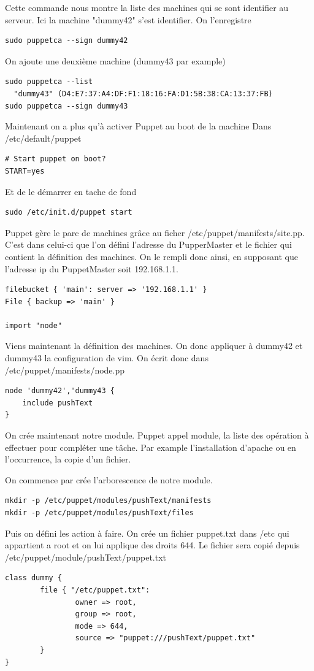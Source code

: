 \documentclass[a4paper,oneside]{report}
\begin{document}
Cette commande nous montre la liste des machines qui se sont identifier au serveur.
Ici la machine "dummy42" s'est identifier.
On l'enregistre
\begin{verbatim}
sudo puppetca --sign dummy42
\end{verbatim}

On ajoute une deuxième machine (dummy43 par example)
\begin{verbatim}
sudo puppetca --list
  "dummy43" (D4:E7:37:A4:DF:F1:18:16:FA:D1:5B:38:CA:13:37:FB)
sudo puppetca --sign dummy43
\end{verbatim}

Maintenant on a plus qu'à activer Puppet au boot de la machine
Dans /etc/default/puppet
\begin{verbatim}
# Start puppet on boot?
START=yes
\end{verbatim}
Et de le démarrer en tache de fond
\begin{verbatim}
sudo /etc/init.d/puppet start
\end{verbatim}

Puppet gère le parc de machines grâce au ficher /etc/puppet/manifests/site.pp. C'est dans celui-ci que l'on défini l'adresse du PupperMaster et le fichier qui contient la définition des machines. On le rempli donc ainsi, en supposant que l'adresse ip du PuppetMaster soit 192.168.1.1.
\begin{verbatim}
filebucket { 'main': server => '192.168.1.1' }
File { backup => 'main' }
 
import "node"
\end{verbatim}

Viens maintenant la définition des machines. On donc appliquer à dummy42 et dummy43 la configuration de vim. On écrit donc dans /etc/puppet/manifests/node.pp
\begin{verbatim}
node 'dummy42','dummy43 {
    include pushText
}
\end{verbatim}

On crée maintenant notre module. Puppet appel module, la liste des opération à effectuer pour compléter une tâche. Par example l'installation d'apache ou en l'occurrence, la copie d'un fichier.

On commence par crée l'arborescence de notre module.
\begin{verbatim}
mkdir -p /etc/puppet/modules/pushText/manifests
mkdir -p /etc/puppet/modules/pushText/files
\end{verbatim}

Puis on défini les action à faire. On crée un fichier puppet.txt dans /etc qui appartient a root et on lui applique des droits 644. Le fichier sera copié depuis /etc/puppet/module/pushText/puppet.txt 
\begin{verbatim}
class dummy {
        file { "/etc/puppet.txt":
                owner => root,
                group => root,
                mode => 644,
                source => "puppet:///pushText/puppet.txt"
        }
}
\end{verbatim}
\end{document}
